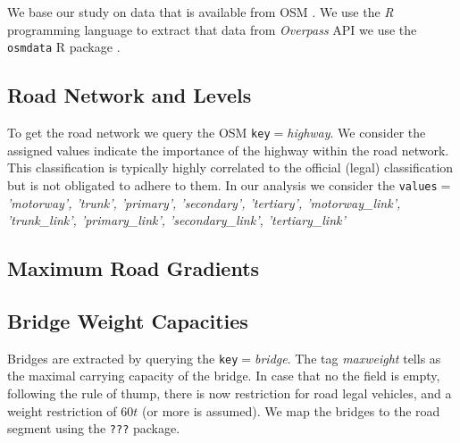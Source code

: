 %

We base our study on data that is available from OSM \cite{OpenStreetMap}.
We use the \emph{R} programming language \cite{RVienna} to extract that data from
\emph{Overpass} API we use the \texttt{osmdata} R package \cite{osmdataR20221}.


\subsection{Road Network and Levels}
To get the road network we query the OSM \texttt{key}$=$\textit{highway}. We consider the
assigned values indicate the importance of the highway within the road network.
This classification is typically highly correlated to the official (legal) classification
but is not obligated to adhere to them. In our analysis we consider the
\texttt{values}$=$
\textit{'motorway', 'trunk', 'primary', 'secondary', 'tertiary', 'motorway\_link', 'trunk\_link', 'primary\_link', 'secondary\_link', 'tertiary\_link'}

\subsection{Maximum Road Gradients}


\subsection{Bridge Weight Capacities}
Bridges are extracted by querying the \texttt{key}$=$\textit{bridge}. The tag \textit{maxweight}
tells as the maximal carrying capacity of the bridge. In case that no the field is empty,
following the rule of thump, there is now restriction for road legal vehicles, and
a weight restriction of $60t$ (or more is assumed).
We map the bridges to the road segment using the \texttt{???} package.
